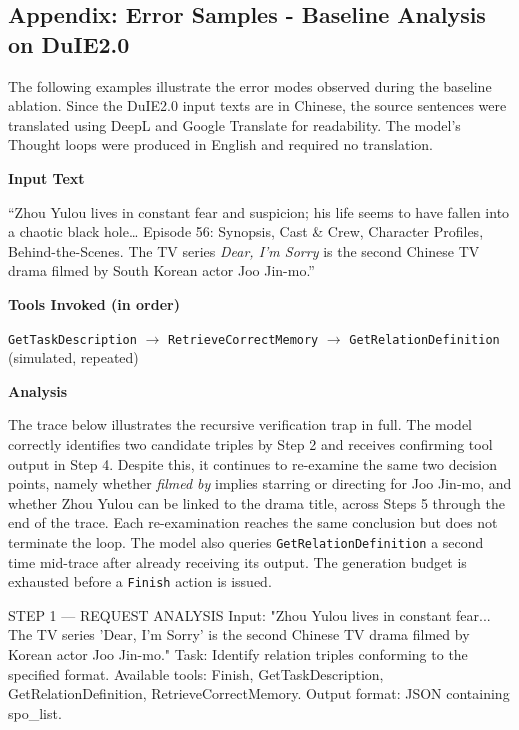 \begin{appendices}
\chapter{Appendix: Error Samples - Baseline Analysis on DuIE2.0}
\label{app:error_samples_duie}

The following examples illustrate the error modes observed during
the baseline ablation. Since the DuIE2.0 input texts are in Chinese,
the source sentences were translated using DeepL and Google Translate
for readability. The model's Thought loops were produced in English
and required no translation.

\begin{tcolorbox}[errorbox, title=Example 1 — Recursive Verification Trap
(AgentRE\textsubscript{orig} Test Set Example 10 Attempt 1)]

\textbf{Input Text}

\smallskip\small
``Zhou Yulou lives in constant fear and suspicion; his life seems to
have fallen into a chaotic black hole\ldots{} Episode 56: Synopsis,
Cast \& Crew, Character Profiles, Behind-the-Scenes. The TV series
\textit{Dear, I'm Sorry} is the second Chinese TV drama filmed by
South Korean actor Joo Jin-mo.''

\medskip
\textbf{Tools Invoked (in order)}

\smallskip\small
\texttt{GetTaskDescription} $\rightarrow$ \texttt{RetrieveCorrectMemory}
$\rightarrow$ \texttt{GetRelationDefinition} (simulated, repeated)

\medskip
\textbf{Analysis}

\smallskip\small
The trace below illustrates the recursive verification trap in full.
The model correctly identifies two candidate triples by Step 2 and
receives confirming tool output in Step 4. Despite this, it continues
to re-examine the same two decision points, namely whether
\textit{filmed by} implies starring or directing for Joo Jin-mo, and
whether Zhou Yulou can be linked to the drama title, across Steps 5
through the end of the trace. Each re-examination reaches the same
conclusion but does not terminate the loop. The model also queries
\texttt{GetRelationDefinition} a second time mid-trace after already
receiving its output. The generation budget is exhausted before a
\texttt{Finish} action is issued.

\end{tcolorbox}

\begin{tcolorbox}[tracebox, title=Model Reasoning Trace]
STEP 1 — REQUEST ANALYSIS
  Input: "Zhou Yulou lives in constant fear... The TV series
  'Dear, I'm Sorry' is the second Chinese TV drama filmed by
  Korean actor Joo Jin-mo."
  Task: Identify relation triples conforming to the specified format.
  Available tools: Finish, GetTaskDescription,
                   GetRelationDefinition, RetrieveCorrectMemory.
  Output format: JSON containing spo_list.


\end{tcolorbox}
\end{appendices}
